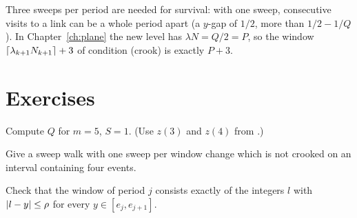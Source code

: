 
\begin{remark}
Three sweeps per period are needed for survival: with one sweep, consecutive visits to a link can be a whole period apart (a $y$-gap of $1/2$, more than $1/2-1/Q$). In
Chapter~\ref{ch:plane} the new level has $\lambda N=Q/2=P$, so the window $\left\lceil \lambda_{k+1}N_{k+1}\right\rceil+3$ of condition (crook) is exactly $P+3$.
\end{remark}

\section*{Exercises}

\begin{exercise}
Compute $Q$ for $m=5$, $S=1$. (Use $z(3)$ and $z(4)$ from .)
\end{exercise}

\begin{exercise}
Give a sweep walk with one sweep per window change which is not crooked on an interval containing four events.
\end{exercise}

\begin{exercise}
Check that the window of period $j$ consists exactly of the integers $l$ with $\left\lvert l-y\right\rvert\le\rho$ for every $y\in[e_j,e_{j+1}]$.
\end{exercise}
